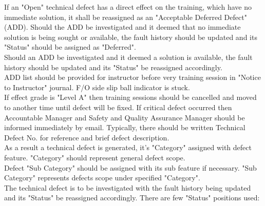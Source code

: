             \vspace{3mm}
            If an "Open" technical defect has a direct effect on the training, which have no immediate solution, it shall be reassigned as an "Acceptable 
            Deferred Defect" (ADD). Should the ADD be investigated and it deemed that no immediate solution is being sought or available, the fault history 
            should be updated and its "Status" should be assigned as "Deferred". \\ 
            \vspace{3mm}
            Should an ADD be investigated and it deemed a solution is available, the fault history should be updated and its "Status" be reassigned accordingly. \\ 
            \vspace{3mm}
            ADD list should be provided for instructor before very training session in "Notice to Instructor" journal. F/O side slip ball indicator is stuck. \\ 
            \vspace{3mm}
            If effect grade is "Level A" then training sessions should be cancelled and moved to another time until defect will be fixed. If critical defect occurred 
            then Accountable Manager and Safety and Quality Assurance Manager should be informed immediately by email. Typically, there should be written Technical 
            Defect No. for reference and brief defect description. \\
            \vspace{3mm}
            As a result a technical defect is generated, it's "Category" assigned with defect feature. "Category" should represent general defect scope. \\ 
            \vspace{3mm}
            Defect "Sub Category" should be assigned with its sub feature if necessary. "Sub Category" represents defects scope under specified "Category". \\ 
            \vspace{3mm}
            The technical defect is to be investigated with the fault history being updated and its "Status" be reassigned accordingly. There are few "Status" 
            positions used: 
